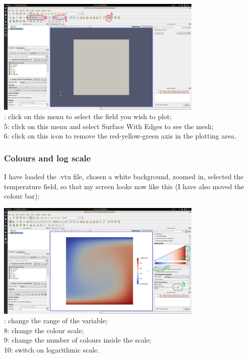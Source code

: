 \begin{center}
\includegraphics[width=10cm]{images/paraview/p4}\\
{: click on this menu to select the field you wish to plot;\\
5: click on this menu and select Surface With Edges to see the mesh;\\
6: click on this icon to remove the red-yellow-green axis in the plotting area.\\}
\end{center}



\subsubsection*{Colours and log scale}

I have loaded the .vtu file, chosen a white background, zoomed in, selected the temperature field, so that 
my screen looks now like this (I have also moved the colour bar):

\begin{center}
\includegraphics[width=10cm]{images/paraview/p5}\\
{: change the range of the variable; \\
8: change the colour scale; \\
9: change the number of colours inside the scale; \\
10: switch on logarithmic scale.}
\end{center}

